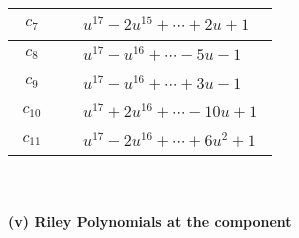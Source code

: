 \documentclass[1p]{elsarticle_modified}
\theoremstyle{definition}
\begin{document}
\begin{tabular}{m{50pt}|m{274pt}}
\hline $$\begin{aligned}c_{7}\end{aligned}$$&$\begin{aligned}
&u^{17}-2 u^{15}+\cdots+2 u+1
\end{aligned}$\\
\hline $$\begin{aligned}c_{8}\end{aligned}$$&$\begin{aligned}
&u^{17}- u^{16}+\cdots-5 u-1
\end{aligned}$\\
\hline $$\begin{aligned}c_{9}\end{aligned}$$&$\begin{aligned}
&u^{17}- u^{16}+\cdots+3 u-1
\end{aligned}$\\
\hline $$\begin{aligned}c_{10}\end{aligned}$$&$\begin{aligned}
&u^{17}+2 u^{16}+\cdots-10 u+1
\end{aligned}$\\
\hline $$\begin{aligned}c_{11}\end{aligned}$$&$\begin{aligned}
&u^{17}-2 u^{16}+\cdots+6 u^2+1
\end{aligned}$\\
\hline
\end{tabular}\\~\\
\newpage\renewcommand{\arraystretch}{1}
\flushleft \textbf{(v) Riley Polynomials at the component}\newline \\
\end{document}
